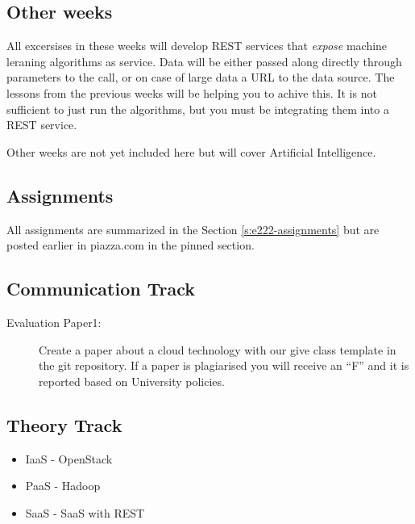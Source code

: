 \subsection{Other weeks}

All excersises in these weeks will develop REST services that {\em
  expose} machine leraning algorithms as service. Data will be either
passed along directly through parameters to the call, or on case of
large data a URL to the data source. The lessons from the previous
weeks will be helping you to achive this. It is not sufficient to just
run the algorithms, but you must be integrating them into a REST service.

Other weeks are not yet included here but will cover Artificial
Intelligence.

\subsection{Assignments}

All assignments are summarized in the Section \ref{s:e222-assignments}
but are posted earlier in piazza.com in the pinned section.


\subsection{Communication Track}




\begin{description}
\item[Evaluation Paper1:] Create a paper about a cloud technology with
  our give class template in the git repository. If a paper is
  plagiarised you will receive an ``F'' and it is reported based on
  University policies.
\end{description}

\subsection{Theory Track}

\begin{itemize}
\item IaaS - OpenStack
\item PaaS - Hadoop
\item SaaS - SaaS with REST
\end{itemize}

